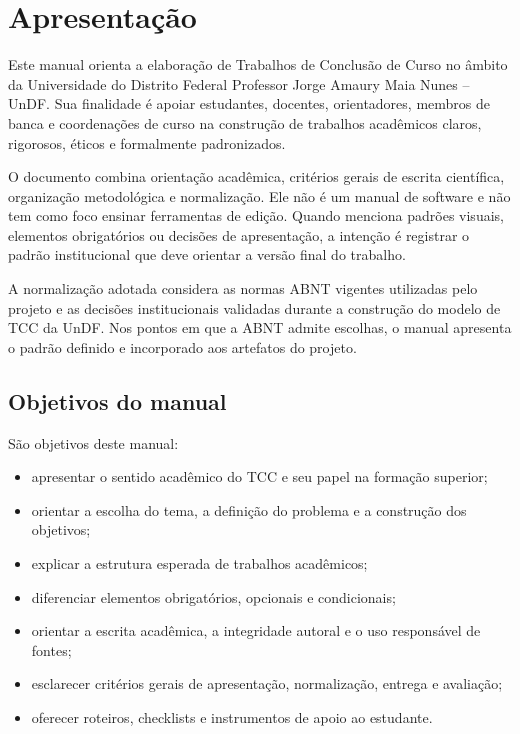 \chapter*{Apresentação}

Este manual orienta a elaboração de Trabalhos de Conclusão de Curso no âmbito da Universidade do Distrito Federal Professor Jorge Amaury Maia Nunes -- UnDF. Sua finalidade é apoiar estudantes, docentes, orientadores, membros de banca e coordenações de curso na construção de trabalhos acadêmicos claros, rigorosos, éticos e formalmente padronizados.

O documento combina orientação acadêmica, critérios gerais de escrita científica, organização metodológica e normalização. Ele não é um manual de software e não tem como foco ensinar ferramentas de edição. Quando menciona padrões visuais, elementos obrigatórios ou decisões de apresentação, a intenção é registrar o padrão institucional que deve orientar a versão final do trabalho.

A normalização adotada considera as normas ABNT vigentes utilizadas pelo projeto e as decisões institucionais validadas durante a construção do modelo de TCC da UnDF. Nos pontos em que a ABNT admite escolhas, o manual apresenta o padrão definido e incorporado aos artefatos do projeto.


\section*{Objetivos do manual}

São objetivos deste manual:

\begin{itemize}
  \item apresentar o sentido acadêmico do TCC e seu papel na formação superior;
  \item orientar a escolha do tema, a definição do problema e a construção dos objetivos;
  \item explicar a estrutura esperada de trabalhos acadêmicos;
  \item diferenciar elementos obrigatórios, opcionais e condicionais;
  \item orientar a escrita acadêmica, a integridade autoral e o uso responsável de fontes;
  \item esclarecer critérios gerais de apresentação, normalização, entrega e avaliação;
  \item oferecer roteiros, checklists e instrumentos de apoio ao estudante.
\end{itemize}

